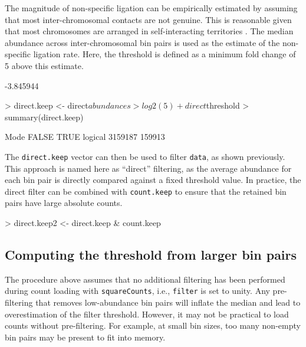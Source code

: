 \documentclass[12pt]{report}
\renewenvironment{Schunk}{\vspace{0pt}}{\vspace{0pt}}
\newcommand{\code}[1]{{\small\texttt{#1}}}
\begin{document}
The magnitude of non-specific ligation can be empirically estimated by assuming that most inter-chromosomal contacts are not genuine. 
This is reasonable given that most chromosomes are arranged in self-interacting territories \citep{bickmore2013spatial}.
The median abundance across inter-chromosomal bin pairs is used as the estimate of the non-specific ligation rate. 
Here, the threshold is defined as a minimum fold change of 5 above this estimate.

\begin{Schunk}
\begin{Soutput}
[1] -3.845944
\end{Soutput}
\begin{Sinput}
> direct.keep <- direct$abundances > log2(5) + direct$threshold
> summary(direct.keep)
\end{Sinput}
\begin{Soutput}
   Mode   FALSE    TRUE 
logical 3159187  159913 
\end{Soutput}
\end{Schunk}

The \code{direct.keep} vector can then be used to filter \code{data}, as shown previously.
This approach is named here as ``direct'' filtering, as the average abundance for each bin pair is directly compared against a fixed threshold value.
In practice, the direct filter can be combined with \code{count.keep} to ensure that the retained bin pairs have large absolute counts.

\begin{Schunk}
\begin{Sinput}
> direct.keep2 <- direct.keep & count.keep
\end{Sinput}
\end{Schunk}

\subsection{Computing the threshold from larger bin pairs}
The procedure above assumes that no additional filtering has been performed during count loading with \code{squareCounts}, i.e., \code{filter} is set to unity.
Any pre-filtering that removes low-abundance bin pairs will inflate the median and lead to overestimation of the filter threshold. 
However, it may not be practical to load counts without pre-filtering.
For example, at small bin sizes, too many non-empty bin pairs may be present to fit into memory.
\end{document}
